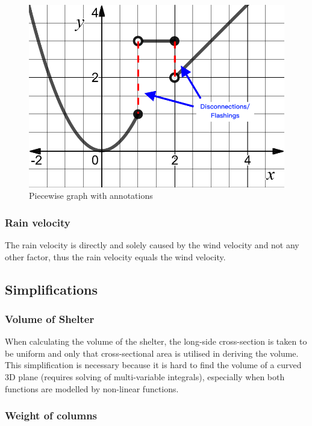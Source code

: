 \documentclass[a4paper,titlepage]{article}
\begin{document}
\begin{figure}[htbp]
    \centering
    \includegraphics[width=\textwidth]{piecewiseGraph.png}
    \caption{Piecewise graph with annotations}
    \label{fig:piecewiseGraph}
\end{figure}

\subsubsection{Rain velocity}

The rain velocity is directly and solely caused by the wind velocity and not any other factor, thus the rain velocity equals the wind velocity.

\subsection{Simplifications}\label{sec:Assumptions and Simplifications:Simplifications}

\subsubsection{Volume of Shelter}

When calculating the volume of the shelter, the long-side cross-section is taken to be uniform and only that cross-sectional area is utilised in deriving the volume. This simplification is necessary because it is hard to find the volume of a curved 3D plane (requires solving of multi-variable integrals), especially when both functions are modelled by non-linear functions.

\subsubsection{Weight of columns}
\end{document}
